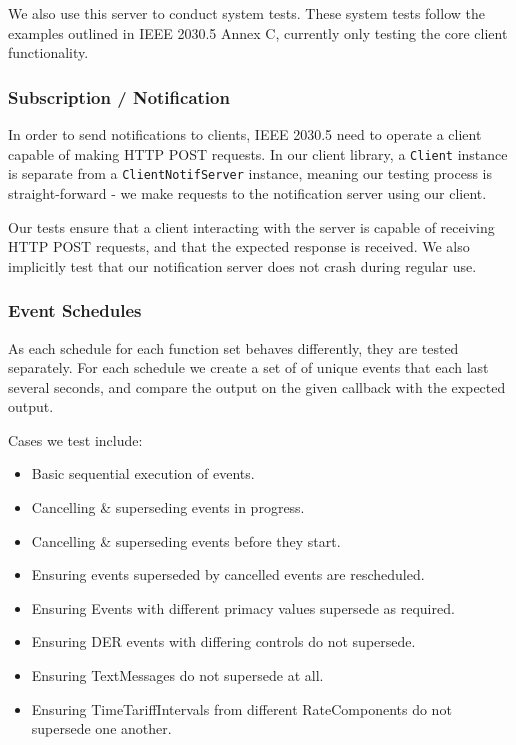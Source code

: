 We also use this server to conduct system tests. These system tests follow the examples outlined in IEEE 2030.5 Annex C, currently only testing the core client functionality.

\subsubsection{Subscription / Notification}
In order to send notifications to clients, IEEE 2030.5 need to operate a client capable of making HTTP POST requests. In our client library, a \texttt{Client} instance is separate from a \texttt{ClientNotifServer} instance, meaning our testing process is straight-forward - we make requests to the notification server using our client. 

Our tests ensure that a client interacting with the server is capable of receiving HTTP POST requests, and that the expected response is received. We also implicitly test that our notification server does not crash during regular use.

\subsubsection{Event Schedules}
As each schedule for each function set behaves differently, they are tested separately. For each schedule we create a set of of unique events that each last several seconds, and compare the output on the given callback with the expected output. 

Cases we test include:

\begin{itemize}
    \item Basic sequential execution of events.
    \item Cancelling \& superseding events in progress.
    \item Cancelling \& superseding events before they start.
    \item Ensuring events superseded by cancelled events are rescheduled.
    \item Ensuring Events with different primacy values supersede as required.
    \item Ensuring DER events with differing controls do not supersede.
    \item Ensuring TextMessages do not supersede at all.
    \item Ensuring TimeTariffIntervals from different RateComponents do not supersede one another.
\end{itemize}

